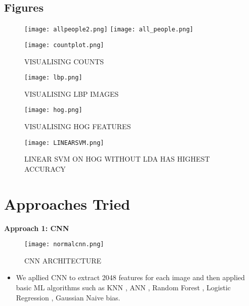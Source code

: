 \documentclass[a4paper]{article}
\theoremstyle{plain}
\theoremstyle{definition}
\begin{document}
	\subsection{Figures}
             \begin{figure}[htbp]
                \centering
                \texttt{[image: allpeople2.png]} %
                \texttt{[image: all\_people.png]}
                \label{fig:example}
            \end{figure}
            \begin{figure}[htbp]
                \centering
                \texttt{[image: countplot.png]} %
               \caption{VISUALISING COUNTS}
            \end{figure}
            \begin{figure}[htbp]
                \centering
                \texttt{[image: lbp.png]} %
                \caption{VISUALISING LBP IMAGES}
                \label{fig:example}
            \end{figure}
            \begin{figure}[htbp]
                \centering
                \texttt{[image: hog.png]} %
                \caption{VISUALISING HOG FEATURES}
                \label{fig:example}
            \end{figure}
            \begin{figure}[htbp]
                \centering
                \texttt{[image: LINEARSVM.png]} %
                \caption{LINEAR SVM ON HOG WITHOUT LDA HAS HIGHEST ACCURACY}
                \label{fig:example}
            \end{figure}
	\newpage
	
	
	\section{Approaches Tried}
	\label{sec:app}
 \textbf{Approach 1: CNN}\vspace{3pt}
  \begin{figure}[htbp]
                \centering
                \texttt{[image: normalcnn.png]} %
                \caption{CNN ARCHITECTURE}
                \label{fig:example}
            \end{figure}
 \begin{itemize}
 \item We apllied CNN to extract 2048 features for each image and then applied basic ML algorithms such as KNN , ANN , Random Forest , Logistic Regression , Gaussian Naive bias.
 \end{itemize}
           
\end{document}

